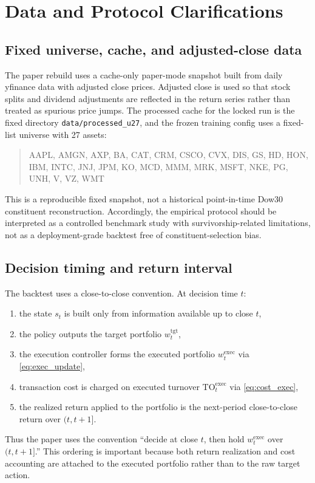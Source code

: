 \documentclass[10pt,twocolumn]{article}
\newcommand{\wexec}{w^{\mathrm{exec}}}
\newcommand{\wtgt}{w^{\mathrm{tgt}}}
\newcommand{\TOexec}{\mathrm{TO}^{\mathrm{exec}}}
\begin{document}
\section{Data and Protocol Clarifications}
\label{app:data_protocol}
\subsection{Fixed universe, cache, and adjusted-close data}
The paper rebuild uses a cache-only paper-mode snapshot built from daily yfinance data with adjusted close prices. Adjusted close is used so that stock splits and dividend adjustments are reflected in the return series rather than treated as spurious price jumps. The processed cache for the locked run is the fixed directory \texttt{data/processed\_u27}, and the frozen training config uses a fixed-list universe with 27 assets:

\begin{quote}
\small\ttfamily
AAPL, AMGN, AXP, BA, CAT, CRM, CSCO, CVX, DIS, GS, HD, HON, IBM, INTC, JNJ, JPM, KO, MCD, MMM, MRK, MSFT, NKE, PG, UNH, V, VZ, WMT
\end{quote}
This is a reproducible fixed snapshot, not a historical point-in-time Dow30 constituent reconstruction. Accordingly, the empirical protocol should be interpreted as a controlled benchmark study with survivorship-related limitations, not as a deployment-grade backtest free of constituent-selection bias.

\subsection{Decision timing and return interval}
The backtest uses a close-to-close convention. At decision time $t$:
\begin{enumerate}[leftmargin=*,itemsep=1pt]
\item the state $s_t$ is built only from information available up to close $t$,
\item the policy outputs the target portfolio $\wtgt_t$,
\item the execution controller forms the executed portfolio $\wexec_t$ via \eqref{eq:exec_update},
\item transaction cost is charged on executed turnover $\TOexec_t$ via \eqref{eq:cost_exec},
\item the realized return applied to the portfolio is the next-period close-to-close return over $(t,t+1]$.
\end{enumerate}
Thus the paper uses the convention ``decide at close $t$, then hold $\wexec_t$ over $(t,t+1]$.'' This ordering is important because both return realization and cost accounting are attached to the executed portfolio rather than to the raw target action.
\end{document}
